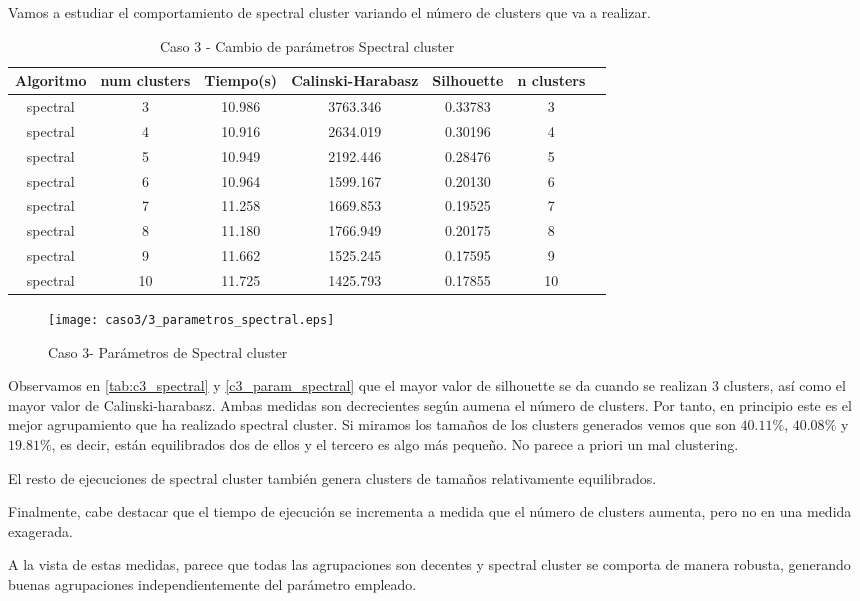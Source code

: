 Vamos a estudiar el comportamiento de spectral cluster variando el número de clusters que va a realizar.

\begin{table}[H]
\centering
\caption{Caso 3 - Cambio de parámetros Spectral cluster}
\label{tab:c3_spectral}
\begin{tabular}{ccccccc}
\toprule
Algoritmo & num clusters & Tiempo(s) & Calinski-Harabasz & Silhouette & n clusters \\
\midrule
spectral & 3 & 10.986 & 3763.346 & 0.33783 & 3 \\
spectral & 4 & 10.916 & 2634.019 & 0.30196 & 4 \\
spectral & 5 & 10.949 & 2192.446 & 0.28476 & 5 \\
spectral & 6 & 10.964 & 1599.167 & 0.20130 & 6 \\
spectral & 7 & 11.258 & 1669.853 & 0.19525 & 7 \\
spectral & 8 & 11.180 & 1766.949 & 0.20175 & 8 \\
spectral & 9 & 11.662 & 1525.245 & 0.17595 & 9 \\
spectral & 10 & 11.725 & 1425.793 & 0.17855 & 10 \\
\bottomrule
\end{tabular}
\end{table}

\begin{figure}[H]
\caption{Caso 3- Parámetros de Spectral cluster}
\label{c3_param_spectral}
\texttt{[image: caso3/3\_parametros\_spectral.eps]}
\end{figure}


Observamos en \eqref{tab:c3_spectral} y \eqref{c3_param_spectral} que el mayor valor de silhouette se da cuando se realizan 3 clusters, así como el mayor valor de Calinski-harabasz. Ambas medidas son decrecientes según aumena el número de clusters. Por tanto, en principio este es el mejor agrupamiento que ha realizado spectral cluster. Si miramos los tamaños de los clusters generados vemos que son $40.11\%$, $40.08\%$ y $19.81\%$, es decir, están equilibrados dos de ellos y el tercero es algo más pequeño. No parece a priori un mal clustering.

El resto de ejecuciones de spectral cluster también genera clusters de tamaños relativamente equilibrados.

Finalmente, cabe destacar que el tiempo de ejecución se incrementa a medida que el número de clusters aumenta, pero no en una medida exagerada.

A la vista de estas medidas, parece que todas las agrupaciones son decentes y spectral cluster se comporta de manera robusta, generando buenas agrupaciones independientemente del parámetro empleado.


